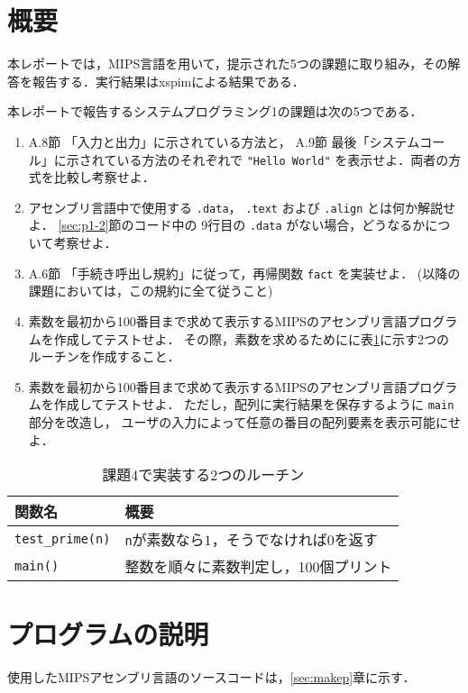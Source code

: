 \section{概要} \label{sec:abstract}
本レポートでは，MIPS言語を用いて，提示された5つの課題に取り組み，その解答を報告する．実行結果はxspimによる結果である．

本レポートで報告するシステムプログラミング1の課題は次の5つである．
\begin{enumerate}
\item A.8節 「入力と出力」に示されている方法と， A.9節 最後「システムコール」に示されている方法のそれぞれで \verb|"Hello World"| を表示せよ．両者の方式を比較し考察せよ．\cite{book:assembly}
\item アセンブリ言語中で使用する \verb|.data|， \verb|.text| および \verb|.align| とは何か解説せよ． \ref{sec:p1-2}節のコード中の 9行目の \verb|.data| がない場合，どうなるかについて考察せよ．
\item A.6節 「手続き呼出し規約」に従って，再帰関数 \verb|fact| を実装せよ． (以降の課題においては，この規約に全て従うこと)\cite{book:assembly}
\item 素数を最初から100番目まで求めて表示するMIPSのアセンブリ言語プログラムを作成してテストせよ． その際，素数を求めるためにに表\ref{tab:routine}に示す2つのルーチンを作成すること．
\item 素数を最初から100番目まで求めて表示するMIPSのアセンブリ言語プログラムを作成してテストせよ． ただし，配列に実行結果を保存するように \verb|main| 部分を改造し， ユーザの入力によって任意の番目の配列要素を表示可能にせよ．
\end{enumerate}

\begin{table}[b]
\centering
	\caption{課題4で実装する2つのルーチン}
	\label{tab:routine}
    	\begin{tabular}{|l|l|}
	\hline
関数名&概要\\
	\hline
\verb|test_prime(n)|&\verb|n|が素数なら$1$，そうでなければ$0$を返す\\
	\hline
\verb|main()|&整数を順々に素数判定し，100個プリント\\
	\hline
	\end{tabular}
\end{table}

\section{プログラムの説明}\label{sec:capp}
使用したMIPSアセンブリ言語のソースコードは，\ref{sec:makep}章に示す．

